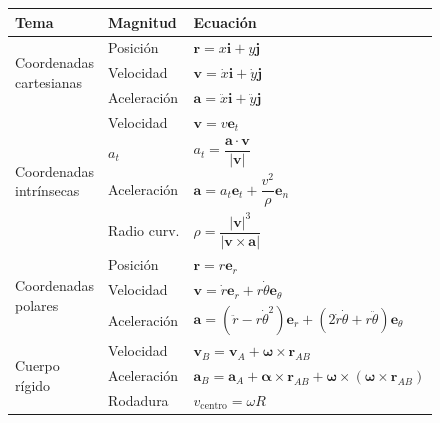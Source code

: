 \documentclass[12pt,a4paper]{article}
\begin{document}
\begin{center}
\begin{tabular}{lll}
\toprule
\textbf{Tema} & \textbf{Magnitud} & \textbf{Ecuación} \\
\midrule
\multirow{3}{*}{\parbox{2.5cm}{Coordenadas\\cartesianas}} & Posición & $\mathbf{r}=x\mathbf{i}+y\mathbf{j}$ \\
                                                     & Velocidad & $\mathbf{v}=\dot{x}\mathbf{i}+\dot{y}\mathbf{j}$ \\
                                                     & Aceleración & $\mathbf{a}=\ddot{x}\mathbf{i}+\ddot{y}\mathbf{j}$ \\
\midrule
\multirow{4}{*}{\parbox{2.5cm}{Coordenadas\\intrínsecas}} & Velocidad & $\mathbf{v}=v\mathbf{e}_t$ \\
                                                      & $a_t$ & $a_t = \dfrac{\mathbf{a}\cdot\mathbf{v}}{|\mathbf{v}|}$ \\
                                                      & Aceleración & $\mathbf{a}=a_t\mathbf{e}_t+\dfrac{v^2}{\rho}\mathbf{e}_n$ \\
                                                      & Radio curv. & $\rho = \dfrac{|\mathbf{v}|^3}{|\mathbf{v}\times\mathbf{a}|}$ \\
\midrule
\multirow{3}{*}{\parbox{2.5cm}{Coordenadas\\polares}} & Posición & $\mathbf{r}=r\mathbf{e}_r$ \\
                                                     & Velocidad & $\mathbf{v}=\dot{r}\mathbf{e}_r+r\dot{\theta}\mathbf{e}_\theta$ \\
                                                     & Aceleración & $\mathbf{a}=(\ddot{r}-r\dot{\theta}^2)\mathbf{e}_r+(2\dot{r}\dot{\theta}+r\ddot{\theta})\mathbf{e}_\theta$ \\
\midrule
\multirow{3}{*}{\parbox{2.5cm}{Cuerpo\\rígido}} & Velocidad & $\mathbf{v}_B=\mathbf{v}_A+\boldsymbol{\omega}\times\mathbf{r}_{AB}$ \\
                                                & Aceleración & $\mathbf{a}_B=\mathbf{a}_A+\boldsymbol{\alpha}\times\mathbf{r}_{AB}+\boldsymbol{\omega}\times(\boldsymbol{\omega}\times\mathbf{r}_{AB})$ \\
                                                & Rodadura & $v_{\text{centro}}=\omega R$ \\
\bottomrule
\end{tabular}
\end{center}
\end{document}
